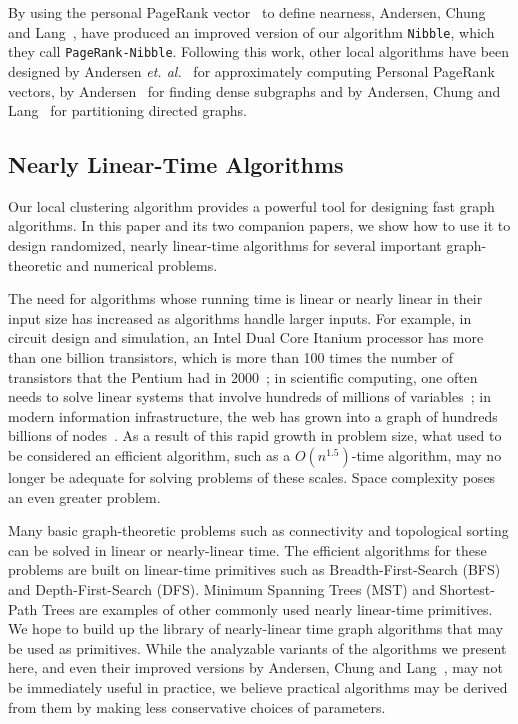 \documentclass[11pt]{article}
\begin{document}
By using the personal PageRank vector~\cite{PageRank}
  to define nearness, Andersen, Chung and Lang~\cite{AndersenChungLang}, 
  have produced an improved version of our algorithm \texttt{Nibble},
  which they call \texttt{PageRank-Nibble}.
Following this work, other local algorithms have been designed by
  Andersen \textit{et. al.}~\cite{AndersenPageRank} for
  approximately computing Personal PageRank vectors, by
  Andersen~\cite{AndersenDense} for finding dense subgraphs
  and by Andersen, Chung and Lang~\cite{AndersenChungLang2} for partitioning
  directed graphs.

\subsection{Nearly Linear-Time Algorithms}

Our local clustering algorithm provides a powerful tool for
  designing fast graph algorithms.
In this paper and its two companion papers, we 
  show how to use it to design randomized, nearly linear-time
  algorithms for several important graph-theoretic and
  numerical problems.

The need for algorithms whose running time is
  linear or nearly linear in their input size
  has increased as algorithms handle larger inputs.
For example, in circuit design and simulation,
  an Intel Dual Core Itanium processor has more than
  one billion transistors, 
  which is  more than 100 times the number of
  transistors that the Pentium had in 2000~\cite{IntelMooresLaw};
  in scientific computing, one often needs to solve linear
  systems that involve hundreds of millions of variables~\cite{LargeScaleScientificComputing};
 in modern information infrastructure, the web has grown into
  a graph of hundreds billions of nodes~\cite{IndexableWeb2005}.
As a result of this rapid growth in problem size, what used to
  be considered an efficient algorithm, such as
  a $O(n^{1.5})$-time algorithm, may no longer be adequate for
  solving problems of these scales.
Space complexity poses an even greater problem.

Many basic graph-theoretic problems such as connectivity
  and topological sorting can be solved in linear or nearly-linear time.
The efficient algorithms for these problems are built on
  linear-time primitives such as Breadth-First-Search
  (BFS) and Depth-First-Search (DFS).
Minimum Spanning Trees (MST) and Shortest-Path Trees are
  examples of other commonly used nearly linear-time primitives.
We hope to build up the library of nearly-linear time
  graph algorithms that may be used as primitives.
While the analyzable variants of the 
  algorithms we present here, and even their improved versions
  by Andersen, Chung and Lang~\cite{AndersenChungLang}, may not be
  immediately useful in practice, we 
  believe practical algorithms may be derived from them by
  making less conservative choices of parameters.
\end{document}
